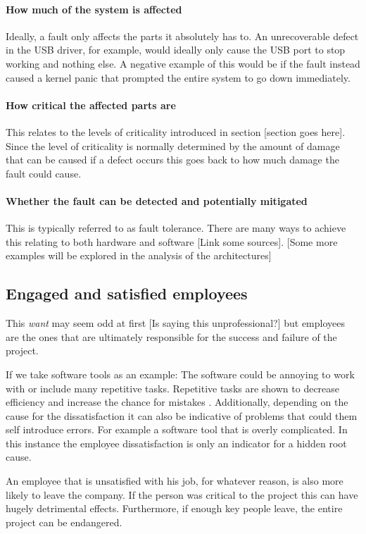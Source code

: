 \paragraph{How much of the system is affected}
Ideally,  a fault only affects the parts it absolutely has to. An unrecoverable defect in the USB driver, for example, would ideally only cause the USB port to stop working and nothing else. A negative example of this would be if the fault instead caused a kernel panic that prompted the entire system to go down immediately.
\paragraph{How critical the affected parts are}
This relates to the levels of criticality introduced in section [section goes here]. Since the level of criticality is normally determined by the amount of damage that can be caused if a defect occurs this goes back to how much damage the fault could cause. 
\paragraph{Whether the fault can be detected and potentially mitigated}
This is typically referred to as fault tolerance. There are many ways to achieve this relating to both hardware and software [Link some sources]. [Some more examples will be explored in the analysis of the architectures]

\subsection{Engaged and satisfied employees}
This \textit{want} may seem odd at first [Is saying this unprofessional?] but employees are the ones that are ultimately responsible for the success and failure of the project.

If we take software tools as an example: The software could be annoying to work with or include many repetitive tasks. Repetitive tasks are shown to decrease efficiency and increase the chance for mistakes \cite{Wyatt.1937}. Additionally, depending on the cause for the dissatisfaction it can also be indicative of problems that could them self introduce errors. For example a software tool that is overly complicated. In this instance the employee dissatisfaction is only an indicator for a hidden root cause.

An employee that is unsatisfied with his job, for whatever reason, is also more likely to leave the company. If the person was critical to the project this can have hugely detrimental effects. Furthermore, if enough key people leave, the entire project can be endangered. 
